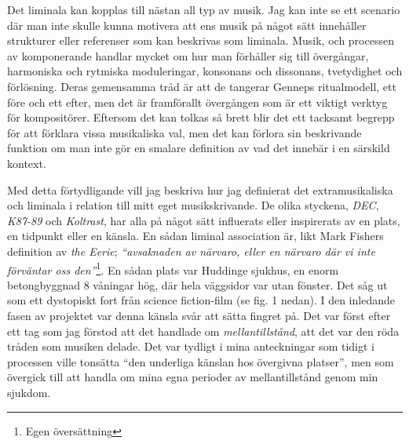 \documentclass{article}
\begin{document}

Det liminala kan kopplas till nästan all typ av musik. Jag kan inte se ett scenario där man inte skulle kunna
motivera att ens musik på något sätt innehåller strukturer eller referenser som kan beskrivas som liminala.
Musik, och processen av komponerande handlar mycket om hur man förhåller sig till övergångar, harmoniska och
rytmiska moduleringar, konsonans och dissonans, tvetydighet och förlösning. Deras gemensamma tråd är att de
tangerar Genneps ritualmodell, ett före och ett efter, men det är framförallt övergången som är ett viktigt
verktyg för kompositörer. Eftersom det kan tolkas så brett blir det ett tacksamt begrepp för att förklara
vissa musikaliska val, men det kan förlora sin beskrivande funktion om man inte gör en smalare definition av
vad det innebär i en särskild kontext.

Med detta förtydligande vill jag beskriva hur jag definierat det extramusikaliska och liminala i
relation till mitt eget musikskrivande. De olika styckena, \emph{DEC}, \emph{K87-89} och \emph{Koltrast}, har
alla på något sätt influerats eller inspirerats av en plats, en tidpunkt eller en känsla. 
En sådan liminal association är, likt Mark Fishers definition av \emph{the Eerie};
\emph{``avsaknaden av närvaro, eller en närvaro där vi inte förväntar oss den''}\footnote{Egen översättning}. En
sådan plats var Huddinge sjukhus, en enorm betongbyggnad 8 våningar hög, där hela väggsidor var utan fönster.
Det såg ut som ett dystopiskt fort från science fiction-film (se fig. 1 nedan). I den inledande fasen av
projektet var denna känsla svår att sätta fingret på. Det var först efter ett tag som jag förstod att det
handlade om \emph{mellantillstånd}, att det var den röda tråden som musiken delade. Det var tydligt i mina
anteckningar som tidigt i processen ville tonsätta ``den underliga känslan hos övergivna platser'', men som
övergick till att handla om mina egna perioder av mellantillstånd genom min sjukdom.
\end{document}
